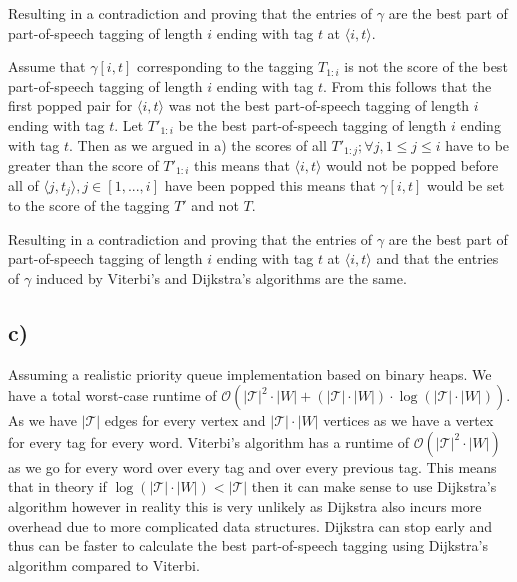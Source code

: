 \documentclass[a4paper,12pt]{ETHexercise}
\begin{document}
Resulting in a contradiction and proving that the entries of $\gamma$ are the best part of part-of-speech tagging of length $i$ ending with tag $t$ at $\langle i, t\rangle$.

Assume that $\gamma[i,t]$ corresponding to the tagging $T_{1:i}$ is not the score of the best part-of-speech tagging of length $i$ ending with tag $t$. From this follows that the first popped pair for $\langle i, t\rangle$ was not the best part-of-speech tagging of length $i$ ending with tag $t$. Let $T'_{1:i}$ be the best part-of-speech tagging of length $i$ ending with tag $t$.
Then as we argued in a) the scores of all $T'_{1:j}; \forall j, 1 \leq j \leq i$ have to be greater than the score of $T'_{1:i}$ this means that $\langle i, t\rangle$ would not be popped before all of $\langle j, t_j\rangle, j \in [1,...,i]$ have been popped this means that $\gamma[i,t]$ would be set to the score of the tagging $T'$ and not $T$.

Resulting in a contradiction and proving that the entries of $\gamma$ are the best part of part-of-speech tagging of length $i$ ending with tag $t$ at $\langle i, t\rangle$ and that the entries of $\gamma$ induced by Viterbi's and Dijkstra's algorithms are the same.

\subsection*{c)}
Assuming a realistic priority queue implementation based on binary heaps. We have a total worst-case runtime of $\mathcal{O}(|\mathcal{T}|^2 \cdot |W| + (|\mathcal{T}| \cdot |W|) \cdot \log (|\mathcal{T}| \cdot |W|))$. As we have $|\mathcal{T}|$ edges for every vertex and $|\mathcal{T}| \cdot |W|$ vertices as we have a vertex for every tag for every word. 
Viterbi's algorithm has a runtime of $\mathcal{O}(|\mathcal{T}|^2 \cdot |W|)$ as we go for every word over every tag and over every previous tag. This means that in theory if $\log(|\mathcal{T}| \cdot |W|) < |\mathcal{T}|$ then it can make sense to use Dijkstra's algorithm however in reality this is very unlikely as Dijkstra also incurs more overhead due to more complicated data structures. Dijkstra can stop early and thus can be faster to calculate the best part-of-speech tagging using Dijkstra's algorithm compared to Viterbi.
\end{document}
